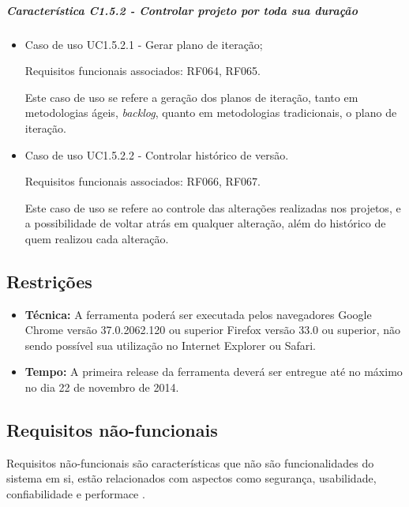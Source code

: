 	\subparagraph{Característica C1.5.2 - Controlar projeto por toda sua duração}
		\begin{itemize}
			
			\item Caso de uso UC1.5.2.1 - Gerar plano de iteração;
					
					Requisitos funcionais associados: RF064, RF065.
					
					Este caso de uso se refere a geração dos planos de iteração, tanto em metodologias ágeis, \textit{backlog}, quanto em metodologias tradicionais, o plano de iteração.

			\item Caso de uso UC1.5.2.2 - Controlar histórico de versão.
				
				Requisitos funcionais associados: RF066, RF067.

				Este caso de uso se refere ao controle das alterações realizadas nos projetos, e a possibilidade de voltar atrás em qualquer alteração, além do histórico de quem realizou cada alteração.

		\end{itemize}

\subsection{Restrições}

\begin{itemize}
	\item \textbf{Técnica:}
		A ferramenta poderá ser executada pelos navegadores Google Chrome versão 37.0.2062.120 ou superior Firefox versão 33.0 ou superior, não sendo possível sua utilização no Internet Explorer ou Safari.
	\item \textbf{Tempo:}
		A primeira release da ferramenta deverá ser entregue até no máximo no dia 22 de novembro de 2014.
\end{itemize}

\subsection{Requisitos não-funcionais}

Requisitos não-funcionais são características que não são funcionalidades do sistema em si, estão relacionados com aspectos como segurança, usabilidade, confiabilidade e performace \cite{derequisitos}.

